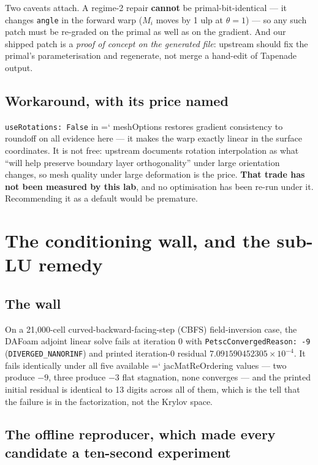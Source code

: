 \documentclass[11pt,a4paper]{article}
\newcommand{\artifact}[1]{{\small\ttfamily\hyphenchar\font=`\-\relax
  \def\_{\textunderscore\allowbreak}#1}}
\begin{document}
Two caveats attach. A regime-2 repair \textbf{cannot} be primal-bit-identical --- it changes
\texttt{angle} in the forward warp (\(M_i\) moves by 1 ulp at \(\theta = 1\)) --- so any such
patch must be re-graded on the primal as well as on the gradient. And our shipped patch is a
\emph{proof of concept on the generated file}: upstream should fix the primal's
parameterisation and regenerate, not merge a hand-edit of Tapenade output.

\subsection{Workaround, with its price named}

\texttt{useRotations: False} in \artifact{meshOptions} restores gradient consistency to
roundoff on all evidence here --- it makes the warp exactly linear in the surface
coordinates. It is not free: upstream documents rotation interpolation as what ``will help
preserve boundary layer orthogonality'' under large orientation changes, so mesh quality
under large deformation is the price. \textbf{That trade has not been measured by this lab},
and no optimisation has been re-run under it. Recommending it as a default would be premature.

\section{The conditioning wall, and the sub-LU remedy}
\label{sec:pc}

\subsection{The wall}

On a 21{,}000-cell curved-backward-facing-step (CBFS) field-inversion case, the DAFoam
adjoint linear solve fails at iteration 0 with \texttt{PetscConvergedReason: -9}
(\texttt{DIVERGED\_NANORINF}) and printed iteration-0 residual
\(7.091590452305\times10^{-4}\). It fails identically under all five available
\artifact{jacMatReOrdering} values --- two produce \(-9\), three produce \(-3\) flat
stagnation, none converges --- and the printed initial residual is identical to 13 digits
across all of them, which is the tell that the failure is in the factorization, not the
Krylov space.

\subsection{The offline reproducer, which made every candidate a ten-second experiment}
\end{document}
